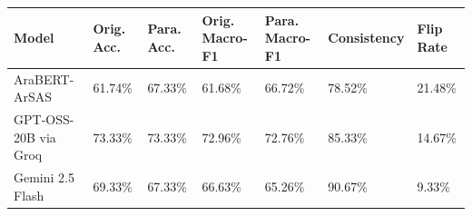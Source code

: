 \begin{tabular}{lllllll}
\toprule
Model & Orig. Acc. & Para. Acc. & Orig. Macro-F1 & Para. Macro-F1 & Consistency & Flip Rate \\
\midrule
AraBERT-ArSAS & 61.74\% & 67.33\% & 61.68\% & 66.72\% & 78.52\% & 21.48\% \\
GPT-OSS-20B via Groq & 73.33\% & 73.33\% & 72.96\% & 72.76\% & 85.33\% & 14.67\% \\
Gemini 2.5 Flash & 69.33\% & 67.33\% & 66.63\% & 65.26\% & 90.67\% & 9.33\% \\
\bottomrule
\end{tabular}
